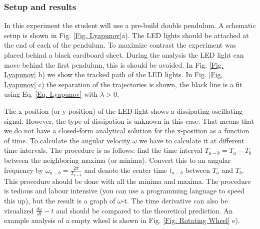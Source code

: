 \documentclass{article}
\begin{document}
\subsubsection{Setup and results}
In this experiment the student will use a pre-build double pendulum. A schematic setup is shown in Fig. \ref{Fig. Lyapunov}a). The LED lights should be attached at the end of each of the pendulum. To maximize contrast the experiment was placed behind a black cardboard sheet. During the analysis the LED light can move behind the first pendulum, this is should be avoided. In Fig. \ref{Fig. Lyapunov} b) we show the tracked path of the LED lights. In Fig. \ref{Fig. Lyapunov} c) the separation of the trajectories is shown, the black line is a fit using Eq. \ref{Eq. Lyapunov} with $\lambda>0$. 

The x-position (or y-position) of the LED light shows a dissipating oscillating signal. However, the type of dissipation is unknown in this case. That means that we do not have a closed-form analytical solution for the x-position as a function of time. To calculate the angular velocity $\omega$ we have to calculate it at different time intervals. The procedure is as follows: find the time interval $T_{a-b}=T_a-T_b$ between the neighboring maxima (or minima). Convert this to an angular frequency by $\omega_{a-b} = \frac{2\pi}{T_{a-b}}$ and denote the center time $t_{a-b}$ between $T_a$ and $T_b$. This procedure should be done with all the minima and maxima. The procedure is tedious and labour intensive (you can use a programming language to speed this up), but the result is a graph of $\omega$-t. The time derivative can also be visualized $\frac{d\omega}{dt}-t$ and should be compared to the theoretical prediction. An example analysis of a empty wheel is shown in Fig. \ref{Fig. Rotating Wheel} e).
\end{document}
